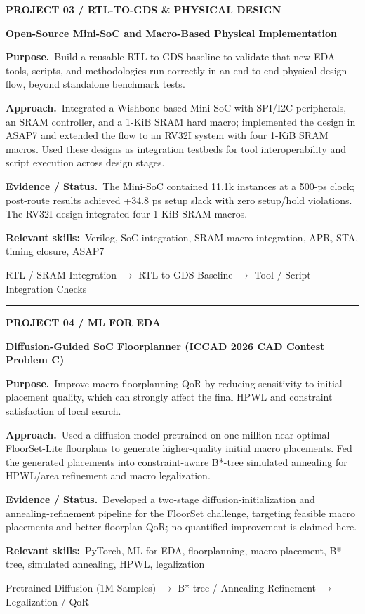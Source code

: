 \documentclass[a4paper,11pt]{article}
\newcommand{\project}[6]{%
  {\small\color{muted}\bfseries #1}\par\vspace{3pt}
  {\fontsize{12}{14}\selectfont\bfseries #2}\par\vspace{7pt}
  {\small\textbf{Purpose.}\ #3}\par\vspace{5pt}
  {\small\textbf{Approach.}\ #4}\par\vspace{5pt}
  {\small\textbf{Evidence / Status.}\ #5}\par\vspace{5pt}
  {\footnotesize\textbf{Relevant skills:}\ #6}\par\vspace{8pt}}
\newcommand{\flowline}[1]{%
  \noindent\colorbox{shade}{%
    \parbox{\dimexpr\linewidth-2\fboxsep}{\centering\footnotesize\color{muted} #1}}
  \par\vspace{12pt}}
\newcommand{\separate}{%
  \par\noindent\color{rulecol}\rule{\linewidth}{0.7pt}\color{ink}\par\vspace{11pt}}
\begin{document}
\project{PROJECT 03 \quad / \quad RTL-TO-GDS \& PHYSICAL DESIGN}
{Open-Source Mini-SoC and Macro-Based Physical Implementation}
{Build a reusable RTL-to-GDS baseline to validate that new EDA tools, scripts, and methodologies run correctly in an end-to-end physical-design flow, beyond standalone benchmark tests.}
{Integrated a Wishbone-based Mini-SoC with SPI/I2C peripherals, an SRAM controller, and a 1-KiB SRAM hard macro; implemented the design in ASAP7 and extended the flow to an RV32I system with four 1-KiB SRAM macros. Used these designs as integration testbeds for tool interoperability and script execution across design stages.}
{The Mini-SoC contained 11.1k instances at a 500-ps clock; post-route results achieved +34.8 ps setup slack with zero setup/hold violations. The RV32I design integrated four 1-KiB SRAM macros.}
{Verilog, SoC integration, SRAM macro integration, APR, STA, timing closure, ASAP7}
\flowline{RTL / SRAM Integration $\longrightarrow$ RTL-to-GDS Baseline $\longrightarrow$ Tool / Script Integration Checks}
\separate

\project{PROJECT 04 \quad / \quad ML FOR EDA}
{Diffusion-Guided SoC Floorplanner (ICCAD 2026 CAD Contest Problem C)}
{Improve macro-floorplanning QoR by reducing sensitivity to initial placement quality, which can strongly affect the final HPWL and constraint satisfaction of local search.}
{Used a diffusion model pretrained on one million near-optimal FloorSet-Lite floorplans to generate higher-quality initial macro placements. Fed the generated placements into constraint-aware B*-tree simulated annealing for HPWL/area refinement and macro legalization.}
{Developed a two-stage diffusion-initialization and annealing-refinement pipeline for the FloorSet challenge, targeting feasible macro placements and better floorplan QoR; no quantified improvement is claimed here.}
{PyTorch, ML for EDA, floorplanning, macro placement, B*-tree, simulated annealing, HPWL, legalization}
\flowline{Pretrained Diffusion (1M Samples) $\longrightarrow$ B*-tree / Annealing Refinement $\longrightarrow$ Legalization / QoR}

\vfill
\end{document}
